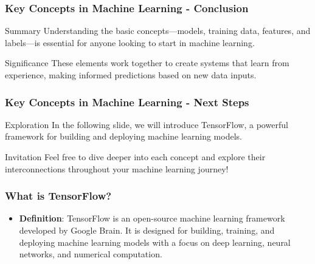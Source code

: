 \documentclass[aspectratio=169]{beamer}
\begin{document}
\begin{frame}[fragile]
    \frametitle{Key Concepts in Machine Learning - Conclusion}
    \begin{block}{Summary}
        Understanding the basic concepts—models, training data, features, and labels—is essential for anyone looking to start in machine learning. 
    \end{block}
    \begin{block}{Significance}
        These elements work together to create systems that learn from experience, making informed predictions based on new data inputs.
    \end{block}
\end{frame}

\begin{frame}[fragile]
    \frametitle{Key Concepts in Machine Learning - Next Steps}
    \begin{block}{Exploration}
        In the following slide, we will introduce TensorFlow, a powerful framework for building and deploying machine learning models.
    \end{block}
    \begin{block}{Invitation}
        Feel free to dive deeper into each concept and explore their interconnections throughout your machine learning journey!
    \end{block}
\end{frame}

\begin{frame}[fragile]
    \frametitle{What is TensorFlow?}
    \begin{itemize}
        \item \textbf{Definition}: TensorFlow is an open-source machine learning framework developed by Google Brain. It is designed for building, training, and deploying machine learning models with a focus on deep learning, neural networks, and numerical computation.
    \end{itemize}
\end{frame}
\end{document}
